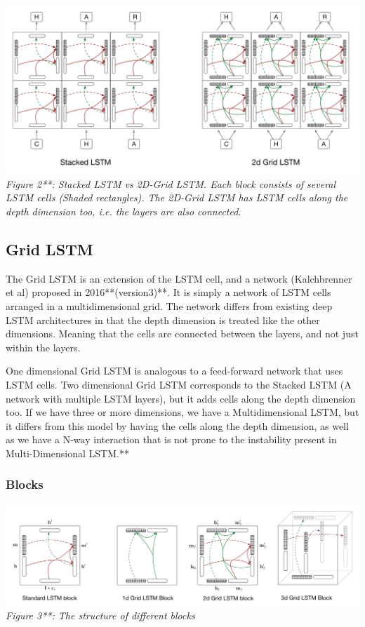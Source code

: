 \documentclass{article} %
\begin{document}
\includegraphics[scale=0.4]{stacked_vs_2dgrid} \newline
\textit{Figure 2**: Stacked LSTM vs 2D-Grid LSTM. Each block consists of several LSTM cells (Shaded rectangles). The 2D-Grid LSTM has LSTM cells along the depth dimension too, i.e. the layers are also connected. }

\subsection{Grid LSTM}
The Grid LSTM is an extension of the LSTM cell, and a network (Kalchbrenner et al) \cite{Kalchbrenner} proposed in 2016**(version3)**. It is simply a network of LSTM cells arranged in a multidimensional grid. The network differs from existing deep LSTM architectures in that the depth dimension is treated like the other dimensions. Meaning that the cells are connected between the layers, and not just within the layers. 

One dimensional Grid LSTM is analogous to a feed-forward network that uses LSTM cells. Two dimensional Grid LSTM corresponds to the Stacked LSTM (A network with multiple LSTM layers), but it adds cells along the depth dimension too. If we have three or more dimensions, we have a Multidimensional LSTM, but it differs from this model by having the cells along the depth dimension, as well as we have a N-way interaction that is not prone to the instability present in Multi-Dimensional LSTM.**


\subsubsection{Blocks}
\includegraphics[scale=0.4]{gridblocks} \newline
\textit{Figure 3**: The structure of different blocks}
\end{document}
